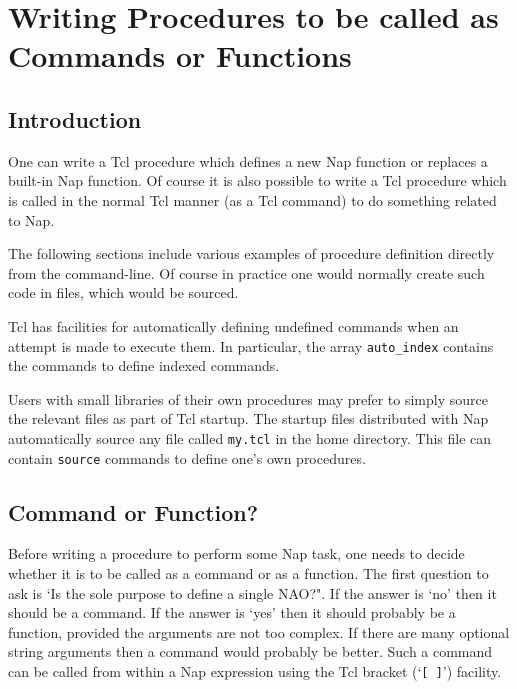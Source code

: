 
\section{Writing Procedures to be called as Commands or Functions}
    \label{writing-procs}

\subsection{Introduction}
    \label{writing-procs-Introduction}

One can write a Tcl procedure which defines a new Nap function
  or replaces a built-in Nap function. Of course it is also possible to
  write a Tcl procedure which is called in the normal Tcl manner (as a
  Tcl command) to do something related to Nap.
  

The following sections include various examples of procedure
  definition directly from the command-line. Of course in practice one
  would normally create such code in files, which would be sourced.
  

Tcl has facilities for automatically defining undefined commands
  when an attempt is made to execute them. In particular, the array 
  \texttt{auto\_index} contains the commands to define indexed
  commands.
  

Users with small libraries of their own procedures may prefer to
  simply source the relevant files as part of Tcl startup. The startup
  files distributed with Nap automatically source any file called 
  \texttt{my.tcl} in the home directory. This file can contain 
  \texttt{source} commands to define one's own procedures.

\subsection{Command or Function?}
    \label{writing-procs-Command-or-Function}

Before writing a procedure to perform some Nap task, one needs
to decide whether it is to be called as a command or as a function.
The first question to ask is `Is the sole purpose to define a single NAO?".
If the answer is `no' then it should be a command.
If the answer is `yes' then it should probably be
a function, provided the arguments are not too complex.
If there are many optional string arguments then a command would probably be better.
Such a command can be called from within a Nap expression using the Tcl bracket 
(`\texttt{[ ]}') facility.

